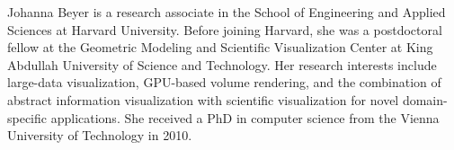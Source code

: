 \documentclass[10pt,journal,compsoc]{IEEEtran}
\begin{document}

\begin{IEEEbiography}{Johanna Beyer}
is a research associate in the School of Engineering and Applied Sciences at Harvard University. Before joining Harvard, she was a postdoctoral fellow at the Geometric Modeling and Scientific Visualization Center at King Abdullah University of Science and Technology. Her research interests include large-data visualization, GPU-based volume rendering, and the combination of abstract information visualization with scientific visualization for novel domain-specific applications. She received a PhD in computer science from the Vienna University of Technology in 2010.
\end{IEEEbiography}
\end{document}
